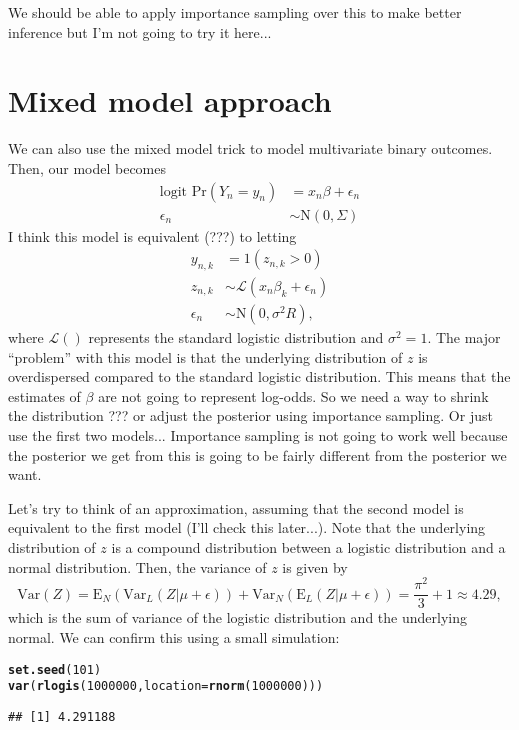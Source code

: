 \documentclass{article}\usepackage[]{graphicx}\usepackage[]{color}
\makeatletter
\newcommand{\hlnum}[1]{\textcolor[rgb]{0.686,0.059,0.569}{#1}}%
\newcommand{\hlstd}[1]{\textcolor[rgb]{0.345,0.345,0.345}{#1}}%
\newcommand{\hlkwc}[1]{\textcolor[rgb]{0.333,0.667,0.333}{#1}}%
\newcommand{\hlkwd}[1]{\textcolor[rgb]{0.737,0.353,0.396}{\textbf{#1}}}%
\newenvironment{kframe}{%
 \def\at@end@of@kframe{}%
 \ifinner\ifhmode%
  \def\at@end@of@kframe{\end{minipage}}%
  \begin{minipage}{\columnwidth}%
 \fi\fi%
 \def\FrameCommand##1{\hskip\@totalleftmargin \hskip-\fboxsep
 \colorbox{shadecolor}{##1}\hskip-\fboxsep
     \hskip-\linewidth \hskip-\@totalleftmargin \hskip\columnwidth}%
 \MakeFramed {\advance\hsize-\width
   \@totalleftmargin\z@ \linewidth\hsize
   \@setminipage}}%
 {\par\unskip\endMakeFramed%
 \at@end@of@kframe}
\newenvironment{knitrout}{}{} %
\makeatother
\begin{document}
We should be able to apply importance sampling over this to make better inference but I'm not going to try it here...

\section{Mixed model approach}

We can also use the mixed model trick to model multivariate binary outcomes. Then, our model becomes
\begin{equation}
\begin{aligned}
\textrm{logit Pr}(Y_n = y_n) &= x_n \beta + \epsilon_n\\
\epsilon_n &\sim \mathrm{N}(0, \Sigma)
\end{aligned}
\end{equation}
I think this model is equivalent (???) to letting 
\begin{equation}
\begin{aligned}
y_{n,k} &= 1(z_{n,k} > 0)\\
z_{n,k} &\sim \mathcal L(x_{n} \beta_k + \epsilon_n) \\
\epsilon_n &\sim \mathrm{N}(0, \sigma^2 R),
\end{aligned}
\end{equation}
where $\mathcal L()$ represents the standard logistic distribution and $\sigma^2 = 1$.
The major ``problem'' with this model is that the underlying distribution of $z$ is overdispersed compared to the standard logistic distribution. 
This means that the estimates of $\beta$ are not going to represent log-odds.
So we need a way to shrink the distribution ??? or adjust the posterior using importance sampling.
Or just use the first two models... Importance sampling is not going to work well because the posterior we get from this is going to be fairly different from the posterior we want.

Let's try to think of an approximation, assuming that the second model is equivalent to the first model (I'll check this later...).
Note that the underlying distribution of $z$ is a compound distribution between a logistic distribution and a normal distribution. Then, the variance of $z$ is given by
$$
\mathrm{Var}(Z) = \mathrm{E}_N(\mathrm{Var}_L(Z|\mu + \epsilon)) + \mathrm{Var}_N(\mathrm{E}_L(Z|\mu + \epsilon)) = \frac{\pi^2}{3} + 1 \approx 4.29,
$$
which is the sum of variance of the logistic distribution and the underlying normal.
We can confirm this using a small simulation:
\begin{knitrout}
\color{fgcolor}\begin{kframe}
\begin{alltt}
\hlkwd{set.seed}\hlstd{(}\hlnum{101}\hlstd{)}
\hlkwd{var}\hlstd{(}\hlkwd{rlogis}\hlstd{(}\hlnum{1000000}\hlstd{,} \hlkwc{location}\hlstd{=}\hlkwd{rnorm}\hlstd{(}\hlnum{1000000}\hlstd{)))}
\end{alltt}
\begin{verbatim}
## [1] 4.291188
\end{verbatim}
\end{kframe}
\end{knitrout}
\end{document}
